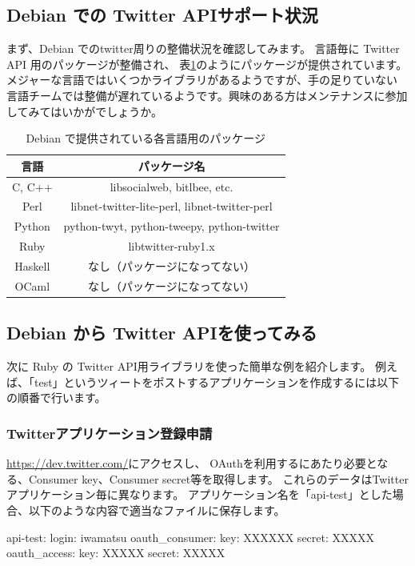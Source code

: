 \documentclass[mingoth,a4paper]{jsarticle}
\begin{document}
\subsection{Debian での Twitter APIサポート状況}

まず、Debian でのtwitter周りの整備状況を確認してみます。
言語毎に Twitter API 用のパッケージが整備され、
表\ref{tab:twitterpakcages}のようにパッケージが提供されています。
メジャーな言語ではいくつかライブラリがあるようですが、手の足りていない
言語チームでは整備が遅れているようです。興味のある方はメンテナンスに参加
してみてはいかがでしょうか。

\begin{table}[ht]
 \caption{Debian で提供されている各言語用のパッケージ}
 \label{tab:twitterpakcages}
\begin{center}
  \begin{tabular}{|c|c|}
 \hline
 言語 & パッケージ名 \\
 \hline
 C, C++ & libsocialweb, bitlbee, etc. \\
 Perl & libnet-twitter-lite-perl, libnet-twitter-perl \\
 Python & python-twyt, python-tweepy, python-twitter \\
 Ruby & libtwitter-ruby1.x \\
 Haskell & なし（パッケージになってない） \\
 OCaml & なし（パッケージになってない） \\
 \hline
 \end{tabular}
\end{center}
\end{table}

\subsection{Debian から Twitter APIを使ってみる}

次に Ruby の Twitter API用ライブラリを使った簡単な例を紹介します。
例えば、「test」というツィートをポストするアプリケーションを作成するには以下の順番で行います。

\subsubsection{Twitterアプリケーション登録申請}

\url{https://dev.twitter.com/}にアクセスし、
OAuthを利用するにあたり必要となる、Consumer key、Consumer secret等を取得します。
これらのデータはTwitterアプリケーション毎に異なります。
アプリケーション名を「api-test」とした場合、以下のような内容で適当なファイルに保存します。
\begin{commandline}
api-test:
    login: iwamatsu
    oauth_consumer:
        key: XXXXXX
        secret: XXXXX
    oauth_access:
        key: XXXXX
        secret: XXXXX
\end{commandline}
\end{document}
